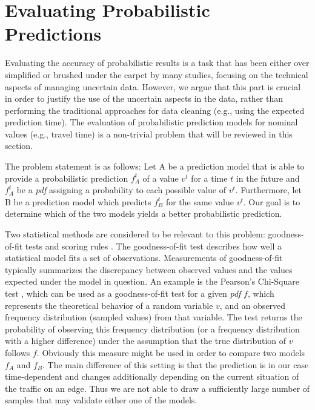 \section{Evaluating Probabilistic Predictions}
\vspace{0.2cm}
\label{sec:evaluate}
Evaluating the accuracy of probabilistic results is a task that has been either over simplified or brushed under the carpet by many studies, focusing on the technical aspects of managing uncertain data. However, we argue that this part is crucial in order to justify the use of the uncertain aspects in the data, rather than performing the traditional approaches for data cleaning (e.g., using the expected prediction time). The evaluation of probabilistic prediction models for nominal values (e.g., travel time) is a non-trivial problem that will be reviewed in this section.

The problem statement is as follows: Let A be a prediction model that is able to provide a probabilistic prediction $f_A^t$ of a value $v^t$ for a time $t$ in the future and $f_A^t$ be a \textit{pdf} assigning a probability to each possible value of $v^t$. Furthermore, let B be a prediction model which predicts $f_B^t$ for the same value $v^t$. Our goal is to determine which of the two models yields a better probabilistic prediction.

Two statistical methods are considered to be relevant to this problem: goodness-of-fit tests \cite{Taylor97} and scoring rules \cite{Bickel07}. The goodness-of-fit test describes how well a statistical model fits a set of observations. Measurements of goodness-of-fit typically summarizes the discrepancy between observed values and the values expected under the model in question. An example is the Pearson's Chi-Square test \cite{Pearson00}, which can be used as a goodness-of-fit test for a given \textit{pdf} $f$, which represents the theoretical behavior of a random variable $v$, and an observed frequency distribution (sampled values) from that variable. The test returns the probability of observing this frequency distribution (or a frequency distribution with a higher difference) under the assumption that the true distribution of $v$ follows $f$. Obviously this measure might be used in order to compare two models $f_A$ and $f_B$. The main difference of this setting is that the prediction is in our case time-dependent and changes additionally depending on the current situation of the traffic on an edge. Thus we are not able to draw a sufficiently large number of samples that may validate either one of the models.

